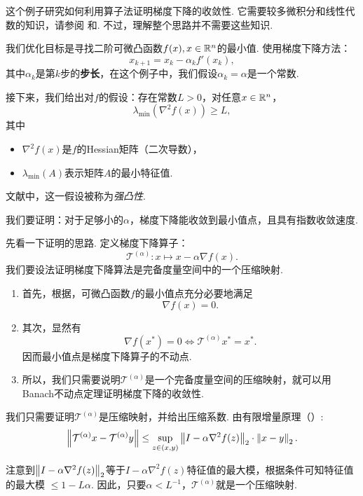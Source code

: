 \begin{example}\label{ex:gradient-descent}
这个例子研究如何利用算子法证明梯度下降的收敛性. 它需要较多微积分和线性代数的知识，请参阅 和. 不过，理解整个思路并不需要这些知识.

我们优化目标是寻找二阶可微凸函数$f(x),x\in \mathbb{R}^n$的最小值. 使用梯度下降方法：
\[x_{k+1}=x_k-\alpha_k f'(x_k),\]
其中$\alpha_k$是第$k$步的\textbf{步长}，在这个例子中，我们假设$\alpha_k=\alpha$是一个常数.


接下来，我们给出对$f$的假设：存在常数$L>0$，对任意$x\in \mathbb{R}^n$，
    \[\lambda_{\min}(\nabla^2 f(x))\geq L,\]
其中
    \begin{itemize}
        \item $\nabla^2f(x)$是$f$的Hessian矩阵（二次导数），
        \item $\lambda_{\min}(A)$表示矩阵$A$的最小特征值.
    \end{itemize}
文献中，这一假设被称为\textit{强凸性}.

我们要证明：对于足够小的$\alpha$，梯度下降能收敛到最小值点，且具有指数收敛速度.

先看一下证明的思路. 定义梯度下降算子：
    \[\mathcal T^{(\alpha)}: x\mapsto x - \alpha\nabla f(x).\]
我们要设法证明梯度下降算法是完备度量空间中的一个压缩映射. 
\begin{enumerate}
    \item 首先，根据，可微凸函数$f$的最小值点充分必要地满足
    \[\nabla f(x)=0.\]
    \item 其次，显然有
    \[\nabla f(x^*)=0 \iff \mathcal T^{(\alpha)}x^*=x^*.\]
    因而最小值点是梯度下降算子的不动点.
    \item 所以，我们只需要说明$\mathcal T^{(\alpha)}$是一个完备度量空间的压缩映射，就可以用Banach不动点定理证明梯度下降的收敛性.
\end{enumerate}

我们只需要证明$\mathcal T^{(\alpha)}$是压缩映射，并给出压缩系数. 由有限增量原理（）:
\[\left\|\mathcal T^{(\alpha)}x - \mathcal T^{(\alpha)}y\right\| \leq \sup_{z\in(x,y)}\left\|I - \alpha \nabla^2 f(z)\right\|_2\cdot\left\|x-y\right\|_2.\]

注意到$\left\|I-\alpha\nabla^2f(z)\right\|_2$等于$I-\alpha\nabla^2f(z)$特征值的最大模，根据条件可知特征值的最大模 $\leq 1-L\alpha$. 因此，只要$\alpha<L^{-1}$，$\mathcal T^{(\alpha)}$就是一个压缩映射.
\end{example}


